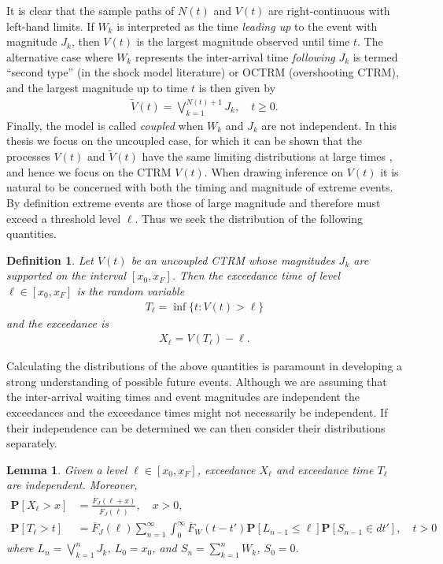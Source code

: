 \documentclass[honours,12pt]{unswthesis}
\newcommand{\pr}{\mathbf {P}}
\newcommand{\1}{\mathbf 1}
\newtheorem{lemma}[equation]{Lemma}
\newtheorem{definition}[equation]{Definition}
\numberwithin{equation}{section}
\theoremstyle{definition}
\theoremstyle{remark}
\begin{document}
It is clear that the sample paths of $N(t)$ and $V(t)$ are right-continuous
with left-hand limits. 
If $W_k$ is interpreted as the time \emph{leading up} to the event with magnitude
$J_k$, then $V(t)$ is the largest magnitude observed until time $t$.
The alternative case where $W_k$ represents the inter-arrival time 
\textit{following} $J_k$ 
is termed ``second type'' (in the shock model literature) or OCTRM
(overshooting CTRM), and the largest magnitude up to time $t$ is then
given by
\begin{align}
\tilde V(t) = \bigvee_{k=1}^{N(t)+1} J_k, \quad t \ge 0.
\end{align}
Finally, the model is called \emph{coupled} when $W_k$ and $J_k$ are not independent.
In this thesis we focus on the uncoupled case,  
for which it can be shown that the processes $V(t)$ and
$\tilde V(t)$ have the same limiting distributions at large times
\cite{Hees2015}, and hence we focus on the CTRM $V(t)$. When drawing inference on $V(t)$ it is natural to be concerned with both the timing and magnitude of extreme events. By definition extreme events are those of large magnitude and therefore must exceed a threshold level $\ell$. Thus we seek the distribution of the following quantities.\\
\begin{definition}
Let $V(t)$ be an uncoupled CTRM whose magnitudes $J_k$ are supported on the interval
$[x_0, x_F]$.  Then the exceedance time of level $\ell \in [x_0,x_F]$ is
the random variable
\begin{align*}
T_\ell = \inf\{t: V(t) > \ell\}
\end{align*}
and the exceedance is 
\begin{align*}
X_\ell = V(T_\ell) - \ell.
\end{align*}
\end{definition}
Calculating the distributions of the above quantities is paramount in developing a strong understanding of possible future events. Although we are assuming that the inter-arrival waiting times and event magnitudes are independent the exceedances and the exceedance times might not necessarily be independent. If their independence can be determined we can then consider their distributions separately.
\begin{lemma}\label{lem:independence}
Given a level $\ell \in [x_0,x_F]$, exceedance $X_\ell$ and exceedance time
$T_\ell$ are independent. Moreover, 
\begin{align*}
\pr[X_\ell > x]
&= \frac{\overline F_J(\ell + x)}{\overline F_J(\ell)}, \quad x > 0,
\\
\pr[T_\ell > t]
&= \overline F_J(\ell) \sum_{n=1}^\infty \int_0^\infty \overline F_W(t-t') \pr[L_{n-1} \le \ell]
\pr[S_{n-1} \in dt'], \quad t > 0
\end{align*}
where $L_n = \bigvee_{k=1}^n J_k$, $L_0 = x_0$, and $S_n = \sum_{k=1}^n W_k$,
$S_0 = 0$.
\end{lemma}
\end{document}
